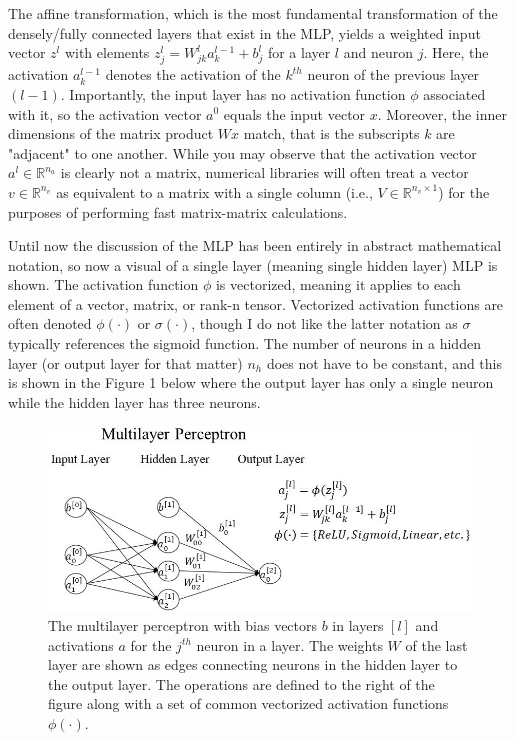 \documentclass{article}
\begin{document}
\quad The affine transformation, which is the most fundamental transformation
of the densely/fully connected layers that exist in the MLP, yields
a weighted input vector $z^{l}$ with elements
$z_j^{l} = W_{jk}^{l} a_{k}^{l-1} + b_{j}^{l}$ for a layer $l$ and neuron $j$.
Here, the activation $a_k^{l-1}$ denotes the activation of the $k^{th}$ neuron of the
previous layer $(l-1)$. Importantly, the input layer has no activation function $\phi$
associated with it, so the activation vector $a^{0}$ equals the input vector $x$.
Moreover, the inner dimensions of the matrix product
$Wx$ match, that is the subscripts $k$ are "adjacent" to one another. While you may
observe that the activation vector $a^{l} \in \mathbb{R}^{n_a}$ is clearly not a matrix,
numerical libraries will often treat a vector $v \in \mathbb{R}^{n_v}$ as equivalent
to a matrix with a single column (i.e., $V \in \mathbb{R}^{n_v \times 1}$) for
the purposes of performing fast matrix-matrix calculations.

Until now the discussion of the MLP has been entirely in abstract mathematical
notation, so now a visual of a single layer (meaning single hidden layer)
MLP is shown. The activation function $\phi$ is vectorized, meaning it
applies to each element of a vector, matrix, or rank-n tensor. Vectorized
activation functions are often denoted $\phi(\cdot)$ or $\sigma(\cdot)$, though I do not like
the latter notation as $\sigma$ typically references the sigmoid function. The number of
neurons in a hidden layer (or output layer for that matter) $n_h$ does not have
to be constant, and this is shown in the Figure 1 below where the output layer
has only a single neuron while the hidden layer has three neurons.

\begin{figure}[h]
	\includegraphics[scale=0.60]{mlp_larger_font_croppped.jpg}
	\caption{The multilayer perceptron with bias vectors $b$ in layers
		$[l]$ and activations $a$ for the $j^{th}$ neuron in a layer. The weights
		$W$ of the last layer are shown as edges connecting neurons in the hidden
		layer to the output layer. The operations are defined to the right
		of the figure along with a set of
		common vectorized activation functions $\phi(\cdot)$.}
\end{figure}
\end{document}
